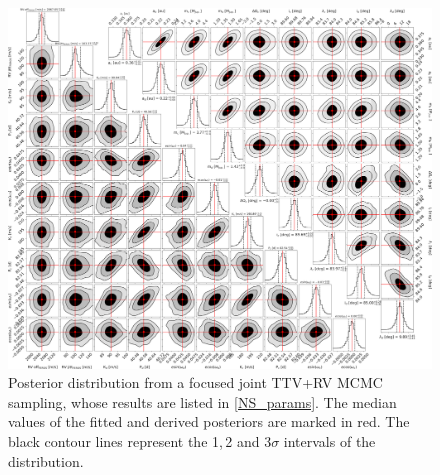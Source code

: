 \documentclass[twocolumn,twocolappendix]{aastex631}
\let\orgautoref\autoref
\renewcommand{\autoref}
        {\def\equationautorefname{Eq.}%
         \def\figureautorefname{Fig.}%
         \def\sectionautorefname{Sect.}%
         \def\subsectionautorefname{Sect.}%
         \def\subsubsectionautorefname{Sect.}%
         \orgautoref}
\begin{document}
\begin{figure}
    
    \includegraphics[width=17cm]{MCMC_posteriors.pdf}
    \caption{Posterior distribution from a focused joint TTV+RV MCMC sampling, whose results are listed in \autoref{NS_params}. The median values of the fitted and derived posteriors are marked in red. The black contour lines represent the 1,\,2 and 3$\sigma$ intervals of the distribution.}
    
    \label{mcmc_posteriors}
    
\end{figure} 




{}



\end{document}
